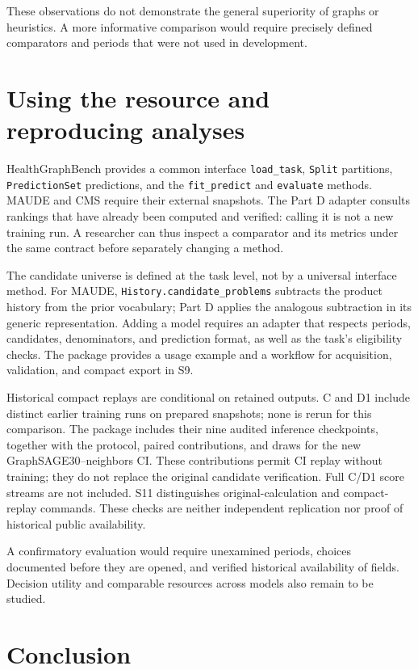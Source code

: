 These observations do not demonstrate the general superiority of graphs or heuristics. A more informative comparison would require precisely defined comparators and periods that were not used in development.


\section{Using the resource and reproducing analyses}
\label{sec:repro}
HealthGraphBench provides a common interface \texttt{load\_task}, \texttt{Split} partitions, \texttt{PredictionSet} predictions, and the \texttt{fit\_predict} and \texttt{evaluate} methods\cite{hgbinterface}. MAUDE and CMS require their external snapshots. The Part D adapter consults rankings that have already been computed and verified: calling it is not a new training run. A researcher can thus inspect a comparator and its metrics under the same contract before separately changing a method.

The candidate universe is defined at the task level, not by a universal interface method. For MAUDE, \texttt{History.candidate\_problems} subtracts the product history from the prior vocabulary; Part D applies the analogous subtraction in its generic representation. Adding a model requires an adapter that respects periods, candidates, denominators, and prediction format, as well as the task's eligibility checks. The package provides a usage example and a workflow for acquisition, validation, and compact export in S9.

Historical compact replays are conditional on retained outputs. C and D1 include distinct earlier training runs on prepared snapshots; none is rerun for this comparison. The package includes their nine audited inference checkpoints, together with the protocol, paired contributions, and draws for the new GraphSAGE30--neighbors CI. These contributions permit CI replay without training; they do not replace the original candidate verification. Full C/D1 score streams are not included. S11 distinguishes original-calculation and compact-replay commands. These checks are neither independent replication nor proof of historical public availability.

A confirmatory evaluation would require unexamined periods, choices documented before they are opened, and verified historical availability of fields. Decision utility and comparable resources across models also remain to be studied.

\section{Conclusion}

